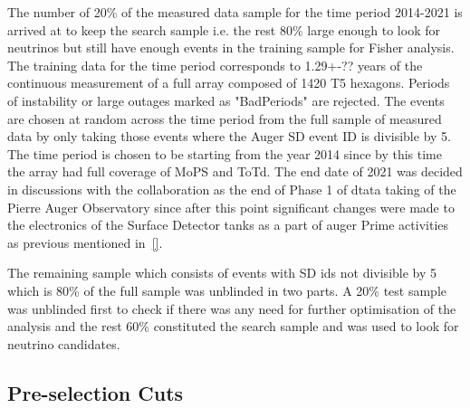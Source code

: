 The number of 20\% of the measured data sample for the time period 2014-2021 is arrived at to keep the search sample i.e. the rest 80\% large enough to look for neutrinos but still have enough events in the training sample for Fisher analysis. The training data for the time period corresponds to 1.29+-?? years of the continuous measurement of a full array composed of 1420 T5 hexagons. Periods of instability or large outages marked as "BadPeriods" are rejected. The events are chosen at random across the time period from the full sample of measured data by only taking those events where the Auger SD event ID is divisible by 5. The time period is chosen to be starting from the year 2014 since by this time the array had full coverage of MoPS and ToTd. The end date of 2021 was decided in discussions with the collaboration as the end of Phase 1 of dtata taking of the Pierre Auger Observatory since after this point significant changes were made to the electronics of the Surface Detector tanks as a part of auger Prime activities as previous mentioned in~\ref{}.

The remaining sample which consists of events with SD ids not divisible by 5 which is 80\% of the full sample was unblinded in two parts. A 20\% test sample was unblinded first to check if there was any need for further optimisation of the analysis and the rest 60\% constituted the search sample and was used to look for neutrino candidates.   

\subsection{Pre-selection Cuts}
\label{subsec:nu_sel_preselcut}

